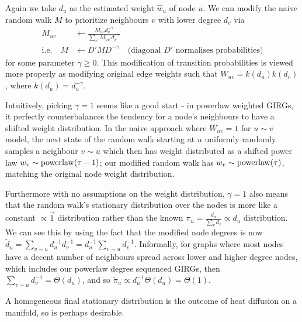 Again we take $d_u$ as the estimated weight $\hat{w}_u$ of node $u$. 
We can modify the naive random walk $M$ to prioritize neighbours $v$ with lower degree $d_v$ via
\begin{align}
  M_{uv} &\gets \frac{M_{uv} {d_v^{-\gamma}}}{\sum_{v'} M_{uv'} {d_{v'}^{-\gamma}}}
  \\
  \text{i.e.} \quad M &\gets D' M D^{-\gamma} \quad \text{(diagonal $D'$ normalises probabilities)}
\end{align}
for some parameter $\gamma \geq 0$. This modification of transition probabilities is viewed more properly as modifying original edge weights such that $W_{uv} = k(d_u) k(d_v)$, where $k(d_u) = d_u^{-\gamma}$.


Intuitively, picking $\gamma=1$ seems like a good start - in powerlaw weighted GIRGs, it perfectly counterbalances the tendency for a node's neighbours to have a shifted weight distribution. In the naive approach where $W_{uv} = 1$ for $u \sim v$  model, the next state of the random walk starting at $u$ uniformly randomly samples a neighbour $v \sim u$ which then has weight distributed as a shifted power law $w_v \sim \operatorname{powerlaw}(\tau - 1)$; our modified random walk has $w_v \sim \operatorname{powerlaw}(\tau)$, matching the original node weight distribution. 

Furthermore with no assumptions on the weight distribution, $\gamma=1$ also means that the random walk's stationary distribution over the nodes is more like a constant $\propto \vec{1}$ distribution rather than the known $\pi_u = \frac{d_u}{\sum_v d_v} \propto d_u$ distribution.
We can see this by using the fact that the modified node degrees is now $\widetilde{d}_u = \sum_{v \sim u} d_u^{-1} d_v^{-1} = d_u^{-1} \sum_{v \sim u} d_v^{-1}$.
Informally, for graphs where most nodes have a decent number of neighbours spread across lower and higher degree nodes, which includes our powerlaw degree sequenced GIRGs, then $\sum_{v \sim u} d_v^{-1} = \Theta(d_u)$, and so $\widetilde{\pi}_u \propto d_u^{-1} \Theta(d_u) = \Theta(1)$.

A homogeneous final stationary distribution is the outcome of heat diffusion on a manifold, so is perhaps desirable.



